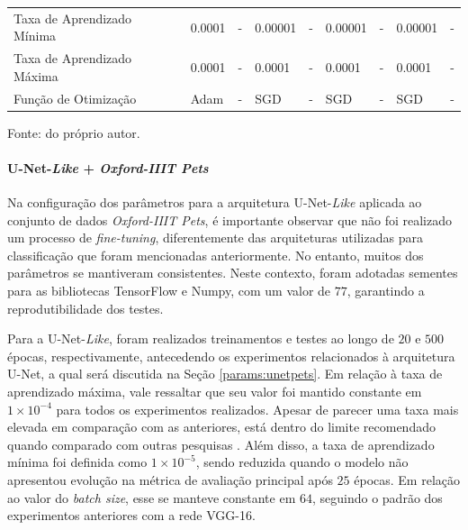 \begin{table}[H]
{\begin{tabular}{l|l|l|l|l|l|l|l|l}
            Taxa de Aprendizado Mínima                   & 0.0001                             & -                       & 0.00001                            & -                       & 0.00001                            & -                       & 0.00001                            & -                                                                  \\
            Taxa de Aprendizado Máxima                   & 0.0001                             & -                       & 0.0001                             & -                       & 0.0001                             & -                       & 0.0001                             & -                                                                  \\
            Função de Otimização                         & Adam                               & -                       & SGD                                & -                       & SGD                                & -                       & SGD                                & -                       
        \end{tabular}
        }

    \vspace*{1 cm}
    Fonte: do próprio autor.
\end{table}


\paragraph{U-Net-\textit{Like} + \textit{Oxford-IIIT Pets}}
\label{params:unetlikepets}
Na configuração dos parâmetros para a arquitetura U-Net-\textit{Like} aplicada ao conjunto de dados \textit{Oxford-IIIT Pets}, é importante observar que não foi realizado um processo de \textit{fine-tuning}, diferentemente das arquiteturas utilizadas para classificação que foram mencionadas anteriormente. No entanto, muitos dos parâmetros se mantiveram consistentes. Neste contexto, foram adotadas sementes para as bibliotecas TensorFlow e Numpy, com um valor de $77$, garantindo a reprodutibilidade dos testes.

Para a U-Net-\textit{Like}, foram realizados treinamentos e testes ao longo de $20$ e $500$ épocas, respectivamente, antecedendo os experimentos relacionados à arquitetura U-Net, a qual será discutida na Seção \ref{params:unetpets}. Em relação à taxa de aprendizado máxima, vale ressaltar que seu valor foi mantido constante em $1 \times 10^{-4}$ para todos os experimentos realizados. Apesar de parecer uma taxa mais elevada em comparação com as anteriores, está dentro do limite recomendado quando comparado com outras pesquisas \citep{Fajar2023CyclicalSegmentation}. Além disso, a taxa de aprendizado mínima foi definida como $1 \times 10^{-5}$, sendo reduzida quando o modelo não apresentou evolução na métrica de avaliação principal após $25$ épocas. Em relação ao valor do \textit{batch size}, esse se manteve constante em $64$, seguindo o padrão dos experimentos anteriores com a rede VGG-16.


